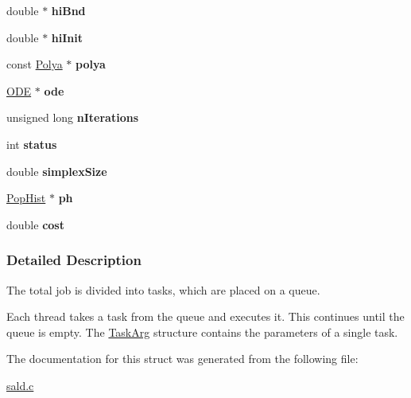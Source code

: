 \begin{DoxyCompactItemize}
\item 
\hypertarget{struct_task_arg_a63587d9ea13f812a1e0a21cf9c7ab82a}{double $\ast$ {\bfseries hi\-Bnd}}\label{struct_task_arg_a63587d9ea13f812a1e0a21cf9c7ab82a}

\item 
\hypertarget{struct_task_arg_ac412e7c2455d061c57be345ba145729d}{double $\ast$ {\bfseries hi\-Init}}\label{struct_task_arg_ac412e7c2455d061c57be345ba145729d}

\item 
\hypertarget{struct_task_arg_a949cfbe280cd447bb94f1c25a5093986}{const \hyperlink{struct_polya}{\-Polya} $\ast$ {\bfseries polya}}\label{struct_task_arg_a949cfbe280cd447bb94f1c25a5093986}

\item 
\hypertarget{struct_task_arg_a79baf18a0489c70c3bdd39cea802316f}{\hyperlink{struct_o_d_e}{\-O\-D\-E} $\ast$ {\bfseries ode}}\label{struct_task_arg_a79baf18a0489c70c3bdd39cea802316f}

\item 
\hypertarget{struct_task_arg_ad043c4e53b915262f36f785032b51764}{unsigned long {\bfseries n\-Iterations}}\label{struct_task_arg_ad043c4e53b915262f36f785032b51764}

\item 
\hypertarget{struct_task_arg_aadb41ca954c38ea9d9318bce2ce96d07}{int {\bfseries status}}\label{struct_task_arg_aadb41ca954c38ea9d9318bce2ce96d07}

\item 
\hypertarget{struct_task_arg_a30c51a4dd79cb5725c53686201f94515}{double {\bfseries simplex\-Size}}\label{struct_task_arg_a30c51a4dd79cb5725c53686201f94515}

\item 
\hypertarget{struct_task_arg_a137a2601af716d43f2569dab6fb74579}{\hyperlink{struct_pop_hist}{\-Pop\-Hist} $\ast$ {\bfseries ph}}\label{struct_task_arg_a137a2601af716d43f2569dab6fb74579}

\item 
\hypertarget{struct_task_arg_a20bd74de3514dafdb30c9615bc950ad8}{double {\bfseries cost}}\label{struct_task_arg_a20bd74de3514dafdb30c9615bc950ad8}

\end{DoxyCompactItemize}


\subsubsection{\-Detailed \-Description}
\-The total job is divided into tasks, which are placed on a queue. 

\-Each thread takes a task from the queue and executes it. \-This continues until the queue is empty. \-The \hyperlink{struct_task_arg}{\-Task\-Arg} structure contains the parameters of a single task. 

\-The documentation for this struct was generated from the following file\-:\begin{DoxyCompactItemize}
\item 
\hyperlink{sald_8c}{sald.\-c}\end{DoxyCompactItemize}
